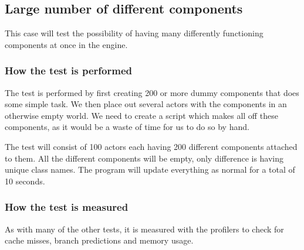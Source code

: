 \subsection{Large number of different components}
This case will test the possibility of having many differently functioning components at once in the engine. 

\subsubsection*{How the test is performed}
The test is performed by first creating 200 or more dummy components that does some simple task. 
We then place out several actors with the components in an otherwise empty world.
We need to create a script which makes all off these components, as it would be a waste of time for us to do so by hand.

The test will consist of 100 actors each having 200 different components attached to them.
All the different components will be empty, only difference is having unique class names.
The program will update everything as normal for a total of 10 seconds.

\subsubsection*{How the test is measured}
As with many of the other tests, it is measured with the profilers to check for cache misses, branch predictions and memory usage.
